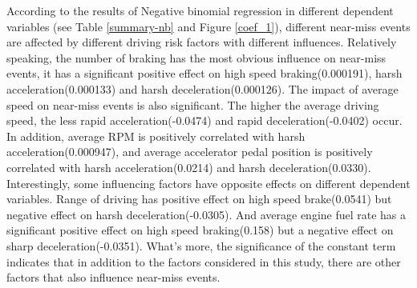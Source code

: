 \documentclass[num-refs]{wiley-article}
\begin{document}
According to the results of Negative binomial regression in different dependent variables (see Table \ref{summary-nb} and Figure \ref{coef_1}), different near-miss events are affected by different driving risk factors with different influences. Relatively speaking, the number of braking has the most obvious influence on near-miss events, it has a significant positive effect on high speed braking(0.000191), harsh acceleration(0.000133) and harsh deceleration(0.000126). The impact of average speed on near-miss events is also significant. The higher the average driving speed, the less rapid acceleration(-0.0474) and rapid deceleration(-0.0402) occur. In addition, average RPM is positively correlated with harsh acceleration(0.000947), and average accelerator pedal position is positively correlated with harsh acceleration(0.0214) and harsh deceleration(0.0330). Interestingly, some influencing factors have opposite effects on different dependent variables. Range of driving has positive effect on high speed brake(0.0541) but negative effect on harsh deceleration(-0.0305). And average engine fuel rate has a significant positive effect on high speed braking(0.158) but a negative effect on sharp deceleration(-0.0351). What's more, the significance of the constant term indicates that in addition to the factors considered in this study, there are other factors that also influence near-miss events.
\end{document}
